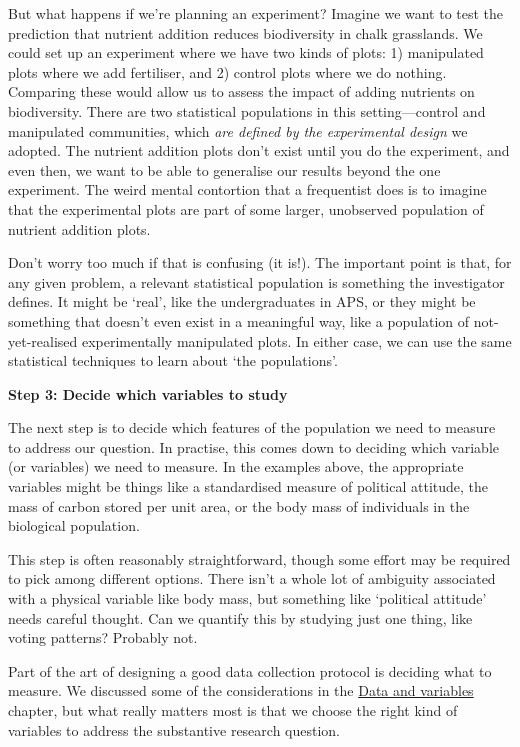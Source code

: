 \documentclass[]{book}
\begin{document}
But what happens if we're planning an experiment? Imagine we want to
test the prediction that nutrient addition reduces biodiversity in chalk
grasslands. We could set up an experiment where we have two kinds of
plots: 1) manipulated plots where we add fertiliser, and 2) control
plots where we do nothing. Comparing these would allow us to assess the
impact of adding nutrients on biodiversity. There are two statistical
populations in this setting---control and manipulated communities, which
\emph{are defined by the experimental design} we adopted. The nutrient
addition plots don't exist until you do the experiment, and even then,
we want to be able to generalise our results beyond the one experiment.
The weird mental contortion that a frequentist does is to imagine that
the experimental plots are part of some larger, unobserved population of
nutrient addition plots.

Don't worry too much if that is confusing (it is!). The important point
is that, for any given problem, a relevant statistical population is
something the investigator defines. It might be `real', like the
undergraduates in APS, or they might be something that doesn't even
exist in a meaningful way, like a population of not-yet-realised
experimentally manipulated plots. In either case, we can use the same
statistical techniques to learn about `the populations'.

\textbf{Step 3: Decide which variables to study}

The next step is to decide which features of the population we need to
measure to address our question. In practise, this comes down to
deciding which variable (or variables) we need to measure. In the
examples above, the appropriate variables might be things like a
standardised measure of political attitude, the mass of carbon stored
per unit area, or the body mass of individuals in the biological
population.

This step is often reasonably straightforward, though some effort may be
required to pick among different options. There isn't a whole lot of
ambiguity associated with a physical variable like body mass, but
something like `political attitude' needs careful thought. Can we
quantify this by studying just one thing, like voting patterns? Probably
not.

Part of the art of designing a good data collection protocol is deciding
what to measure. We discussed some of the considerations in the
\protect\hyperlink{data-and-variables}{Data and variables} chapter, but
what really matters most is that we choose the right kind of variables
to address the substantive research question.
\end{document}
